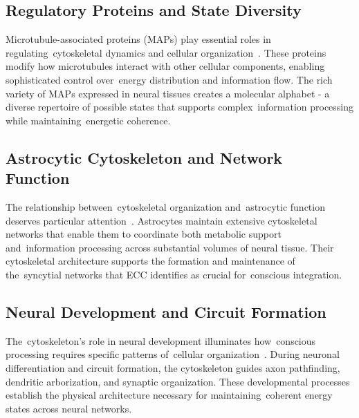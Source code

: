 \subsection*{Regulatory Proteins and State Diversity~~}

Microtubule-associated proteins (MAPs) play essential roles in regulating~cytoskeletal dynamics and cellular organization~\cite{Roll-Mecak2020, Brangwynne2015}. These proteins modify how microtubules interact with other cellular components, enabling sophisticated control over~energy distribution and information flow. The rich variety of MAPs expressed in neural tissues creates a molecular alphabet - a diverse repertoire of possible states that supports complex~information processing while maintaining~energetic coherence.

\subsection*{Astrocytic Cytoskeleton and Network Function~~}

The relationship between~cytoskeletal organization and~astrocytic function deserves particular attention~\cite{Sanchez-Huertas2016, Verkhratsky2018}. Astrocytes maintain extensive cytoskeletal networks that enable them to coordinate both metabolic support and~information processing across substantial volumes of neural tissue. Their cytoskeletal architecture supports the formation and maintenance of the~syncytial networks that ECC identifies as crucial for~conscious integration.

\subsection*{Neural Development and Circuit Formation~~}

The~cytoskeleton's role in neural development illuminates how~conscious processing requires specific patterns of~cellular organization~\cite{Stiess2011, Fletcher2010}. During neuronal differentiation and circuit formation, the cytoskeleton guides axon pathfinding, dendritic arborization, and synaptic organization. These developmental processes establish the physical architecture necessary for maintaining~coherent energy states across neural networks.

